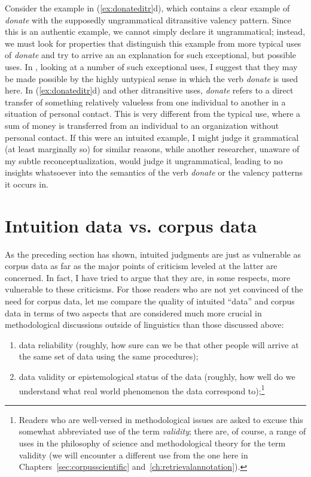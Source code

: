 Consider the example in (\ref{ex:donateditr}d), which contains a clear example of \textit{donate} with the supposedly ungrammatical  ditransitive  valency  pattern. Since this is an authentic  example, we cannot simply declare it ungrammatical; instead, we must look for properties that distinguish this example from more typical uses of \textit{donate} and try to arrive an an explanation  for such exceptional, but possible uses. In \citet{stefanowitsch_linguistics_2007}, looking at a number of such exceptional uses, I suggest that they may be made possible by the highly untypical sense in which the verb  \textit{donate }is used here. In (\ref{ex:donateditr}d) and other ditransitive  uses, \textit{donate} refers to a direct transfer of something relatively valueless from one individual to another in a situation of personal contact. This is very different from the typical use, where a sum of money is transferred from an individual to an organization without personal contact. If this were an intuited  example, I might judge it grammatical (at least marginally so) for similar reasons, while another researcher, unaware of my subtle reconceptualization, would judge it ungrammatical,  leading to no insights whatsoever into the semantics  of the verb \textit{donate} or the valency  patterns it occurs in.

\section{Intuition data vs. corpus data}
\label{sec:intuitiondatavscorpusdata}

As the preceding section has shown, intuited  judgments are just as vulnerable as corpus data as far as the major points of criticism leveled at the latter are concerned. In fact, I have tried to argue that they are, in some respects, more vulnerable to these criticisms. For those readers who are not yet convinced of the need for corpus data, let me compare the quality of intuited ``data'' and corpus data in terms of two aspects that are considered much more crucial in methodological discussions outside of linguistics than those discussed above:

\begin{enumerate}
\item data reliability  (roughly, how sure can we be that other people will arrive at the same set of data using the same procedures);
\item data validity  or epistemological  status of the data (roughly, how well do we understand what real world phenomenon the data correspond to);\footnote{Readers who are well\hyp{}versed in methodological issues are asked to excuse this somewhat abbreviated use of the term \textit{validity};  there are, of course, a range of uses in the philosophy of science and methodological theory for the term validity (we will encounter a different use from the one here in Chapters~\ref{sec:corpusscientific} and~\ref{ch:retrievalannotation}).}
\end{enumerate}

